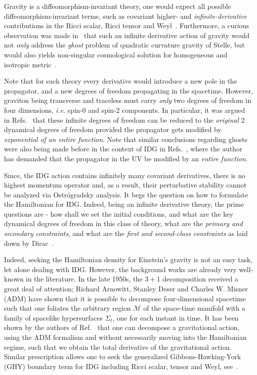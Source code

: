 \documentclass[a4paper,12pt]{article}
\newcommand{\+}{^{\dagger}}
\newcommand{\2}{\frac{1}{2}}
\newcommand{\3}{\frac{1}{3}}
\newcommand{\4}{\frac{1}{4}}
\newcommand{\6}{\frac{1}{6}}
\newcommand{\8}{\frac{1}{8}}
\begin{document}
Gravity is a diffeomorphism-invariant theory, one would expect all possible diffeomorphism-invariant terms, such as covariant higher- and {\it infinite-derivative}
contributions in the Ricci scalar, Ricci tensor and Weyl~\cite{Biswas:2005qr,Biswas:2011ar,Biswas:2013kla,Biswas:2013cha}. 
Furthermore, a curious observation was made in~\cite{Biswas:2005qr,Biswas:2011ar} that such an infinite derivative action of gravity would not {\it only} address  the {\it ghost} problem of quadratic curvature gravity of Stelle, but would also yields non-singular cosmological solution for homogeneous and isotropic metric~\cite{Biswas:2005qr,Biswas:2010zk,Biswas:2012bp}.  

Note that for such theory every derivative would introduce a new pole in the propagator, and a new degrees of freedom propagating 
in the spacetime. However, graviton being transverse and traceless must carry {\it only} two degrees of freedom in four dimensions, \textit{i.e.} spin-0 and spin-2 components. In particular, it was argued in Refs.~\cite{Biswas:2005qr,Biswas:2011ar,Biswas:2013kla,Biswas:2013cha} that these infinite degrees of freedom can be reduced to the {\it original} $2$ dynamical degrees of freedom provided the propagator gets modified by {\it exponential of an entire function}. Note that similar conclusions regarding ghosts were also being made before in the context of 
IDG in Refs.~\cite{Tomboulis, Tomboulis-1,Tomboulis:2015gfa}, where the author has demanded that the propagator in the UV be modified by an {\it entire function}.

Since, the IDG action contains infinitely many covariant derivatives, there is no highest momentum operator and, as a result, their perturbative stability cannot be analyzed via Ostr\'ogradsky analysis. It begs the question on how to formulate the Hamiltonian for IDG. Indeed, being an infinite derivative theory, the prime questions are - how shall we set the initial conditions, and what are the key dynamical degrees of freedom in this class of theory, what are the {\it primary and secondary constraints}, and what are the {\it first and second-class constraints} as laid down by Dirac~\cite{Anderson:1951ta,Dirac:1958sq,Dirac:1958sc,Dirac1}.

Indeed, seeking the Hamiltonian density for Einstein's gravity is not an easy task, let alone dealing with IDG. However, the 
background works are already very well-known in the literature. In the late 1950s, the $3+1$ decomposition received 
a great deal of attention; Richard Arnowitt, Stanley Deser and Charles W. Misner (ADM) 
\cite{Arnowitt:1962hi, Gourgoulhon:2007ue} have shown that it is possible to decompose four-dimensional spacetime
such that one foliates the arbitrary region $\mathcal{M}$ of the space-time manifold with a family of spacelike hypersurfaces 
$\Sigma_{t}$, one for each instant in time. It has been shown by the authors of Ref.~\cite{Deruelle:2009zk}
that one can decompose a gravitational action, using the ADM formalism and without necessarily moving into the Hamiltonian
regime, such that we obtain the total derivative of the gravitational action. Similar prescription allows one to seek the generalized Gibbons-Hawking-York (GHY) boundary term for IDG including Ricci scalar, tensor and Weyl, see~\cite{Teimouri:2016ulk}. 
\end{document}
